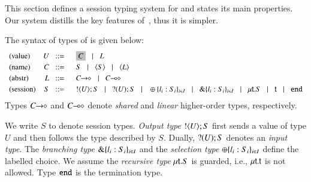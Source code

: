\noi %
This section defines a session typing system for \HOp and states its main properties. 
Our system distills the key features of~\cite{tlca07,MostrousY15},
thus it is simpler.

\smallskip 

The syntax of types of \HOp is given below: 
\[
	\begin{array}{lrl}
		\text{(value)}	& U \bnfis &	\nonhosyntax{C} \bnfbar L\\[1mm]  %
		\text{(name)}   & C  \bnfis &	S \bnfbar \chtype{S} \bnfbar \chtype{L}
		\\[1mm]

		\text{(abstr)}	& L \bnfis &	\shot{C} \bnfbar \lhot{C}
		\\[1mm]

		\text{(session)} &  S \bnfis &	\btout{U} S \bnfbar \btinp{U} S \bnfbar \btsel{l_i:S_i}_{i \in I}
						\bnfbar \btbra{l_i:S_i}_{i \in I} \bnfbar  \trec{t}{S} \bnfbar \vart{t}  \bnfbar \tinact
	\end{array}
\]
Types $C\!\! \rightarrow\!\! \diamond$ and $C\!\! \multimap\!\! \diamond$ denote
{\em shared} and {\em linear} higher-order 
types, respectively.
 
We write $S$ to denote %
session types.  {\em Output type}
$! \langle U \rangle ; S$ %
first sends a value of
type $U$ and then follows the type described by $S$.  Dually,
$? (U) ; S$ denotes an {\em input type}. The {\em branching type}
$\& \{l_i:S_i\}_{i \in I}$ and the {\em selection type}
$\oplus \{l_i:S_i\}_{i \in I}$ define the labelled choice. 
We assume the {\em recursive type} $\mu\mathsf{t}.S$ is guarded,
i.e.,  $\mu\mathsf{t}.\mathsf{t}$ is not allowed. 
Type $\mathtt{end}$ is the termination type. 

